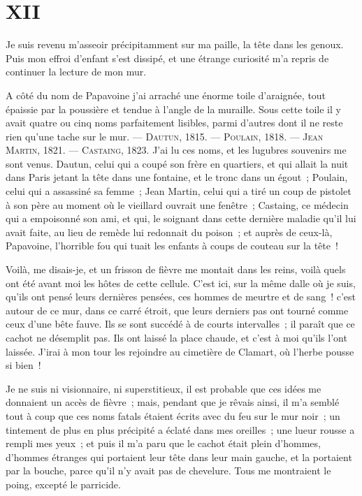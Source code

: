 \documentclass[french,twoside]{book} %
\begin{document}
 \section[{XII}]{XII}
\label{ch12}\renewcommand{\leftmark}{XII}

\noindent Je suis revenu m’asseoir précipitamment sur ma paille, la tête dans les genoux. Puis mon effroi d’enfant s’est dissipé, et une étrange curiosité m’a repris de continuer la lecture de mon mur.\par
A côté du nom de Papavoine j’ai arraché une énorme toile d’araignée, tout épaissie par la poussière et tendue à l’angle de la muraille. Sous cette toile il y avait quatre ou cinq noms parfaitement lisibles, parmi d’autres dont il ne reste rien qu’une tache sur le mur. — D{\scshape autun}, 1815. — P{\scshape oulain}, 1818. — J{\scshape ean} M{\scshape artin}, 1821. — C{\scshape astaing}, 1823. J’ai lu ces noms, et les lugubres souvenirs me sont venus. Dautun, celui qui a coupé son frère en quartiers, et qui allait la nuit dans Paris jetant la tête dans une fontaine, et le tronc dans un égout ; Poulain, celui qui a assassiné sa femme ; Jean Martin, celui qui a tiré un coup de pistolet à son père au moment où le vieillard ouvrait une fenêtre ; Castaing, ce médecin qui a empoisonné son ami, et qui, le soignant dans cette dernière maladie qu’il lui avait faite, au  lieu de remède lui redonnait du poison ; et auprès de ceux-là, Papavoine, l’horrible fou qui tuait les enfants à coups de couteau sur la tête !\par
Voilà, me disais-je, et un frisson de fièvre me montait dans les reins, voilà quels ont été avant moi les hôtes de cette cellule. C’est ici, sur la même dalle où je suis, qu’ils ont pensé leurs dernières pensées, ces hommes de meurtre et de sang ! c’est autour de ce mur, dans ce carré étroit, que leurs derniers pas ont tourné comme ceux d’une bête fauve. Ils se sont succédé à de courts intervalles ; il paraît que ce cachot ne désemplit pas. Ils ont laissé la place chaude, et c’est à moi qu’ils l’ont laissée. J’irai à mon tour les rejoindre au cimetière de Clamart, où l’herbe pousse si bien !\par
Je ne suis ni visionnaire, ni superstitieux, il est probable que ces idées me donnaient un accès de fièvre ; mais, pendant que je rêvais ainsi, il m’a semblé tout à coup que ces noms fatals étaient écrits avec du feu sur le mur noir ; un tintement de plus en plus précipité a éclaté dans mes oreilles ; une lueur rousse a rempli mes yeux ; et puis il m’a paru que le cachot était plein d’hommes, d’hommes étranges qui portaient leur tête dans leur main gauche, et la portaient par la bouche, parce qu’il n’y avait pas de chevelure. Tous me montraient le poing, excepté le parricide.\par
\end{document}
